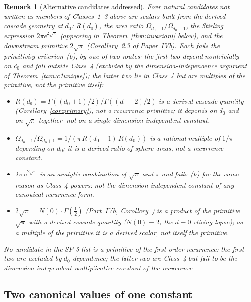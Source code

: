 \documentclass[11pt,a4paper]{article}
\newtheorem{remark}[theorem]{Remark}
\begin{document}
\begin{remark}[Alternative candidates addressed]\label{rem:c1-alternatives}
Four natural candidates not written as members of Classes~1--3 above are
scalars built from the derived cascade geometry at $d_0$:
$R(d_0)$, the area ratio $\Omega_{d_0-1}/\Omega_{d_0+1}$, the Stirling
expression $2\pi e^{2\sqrt{\pi}}$ (appearing in Theorem~\ref{thm:invariant}
below), and the downstream primitive $2\sqrt{\pi}$
(Corollary~2.3 of Paper~IVb). Each fails the primitivity criterion~(b),
by one of two routes: the first two depend nontrivially on $d_0$ and
fall outside Class~4 (excluded by the dimension-independence argument
of Theorem~\ref{thm:c1unique}); the latter two lie in Class~4 but are
multiples of the primitive, not the primitive itself:
\begin{itemize}
\item $R(d_0) = \Gamma((d_0{+}1)/2)/\Gamma((d_0{+}2)/2)$ is a
\emph{derived} cascade quantity (Corollary~\ref{cor:primary}), not a
recurrence primitive; it depends on $d_0$ and on $\sqrt{\pi}$ together,
not on a single dimension-independent constant.
\item $\Omega_{d_0-1}/\Omega_{d_0+1} = 1/(\pi\,R(d_0-1)\,R(d_0))$ is a
rational multiple of $1/\pi$ depending on $d_0$; it is a derived ratio of
sphere areas, not a recurrence constant.
\item $2\pi\,e^{2\sqrt{\pi}}$ is an analytic combination of
$\sqrt{\pi}$ and $\pi$ and fails~(b) for the same reason as Class~4
\emph{powers}: not the dimension-independent constant of any canonical
recurrence form.
\item $2\sqrt{\pi} = N(0)\cdot\Gamma(\tfrac{1}{2})$
(Part~IVb, Corollary~) is a \emph{product} of the primitive
$\sqrt{\pi}$ with a derived cascade quantity ($N(0) = 2$, the $d{=}0$
slicing lapse); as a multiple of the primitive it is a derived scalar, not
itself the primitive.
\end{itemize}
No candidate in the SP-5 list is a primitive of the first-order
recurrence: the first two are excluded by $d_0$-dependence; the latter
two are Class~4 but fail to be \emph{the} dimension-independent
multiplicative constant of the recurrence.
\end{remark}

\subsection{Two canonical values of one constant}
\end{document}

